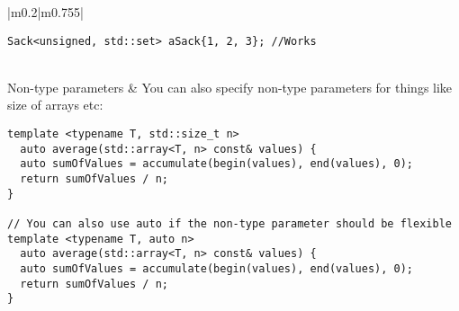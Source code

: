 \documentclass[main.tex,fontsize=8pt,paper=a4,paper=portrait,DIV=calc,]{scrartcl}
\begin{document}
\begin{table}[ht!]
\begin{tabular}{|m{0.2\linewidth}|m{0.755\linewidth}|}
\begin{lstlisting}
Sack<unsigned, std::set> aSack{1, 2, 3}; //Works
\end{lstlisting}\\
\hline
Non-type parameters & 
You can also specify non-type parameters for things like size of arrays etc:\newline
\begin{lstlisting}
template <typename T, std::size_t n>
  auto average(std::array<T, n> const& values) {
  auto sumOfValues = accumulate(begin(values), end(values), 0);
  return sumOfValues / n;
}

// You can also use auto if the non-type parameter should be flexible
template <typename T, auto n>
  auto average(std::array<T, n> const& values) {
  auto sumOfValues = accumulate(begin(values), end(values), 0);
  return sumOfValues / n;
}
\end{lstlisting}\\
\hline
\end{tabular}
\end{table}
\pagebreak
\begin{table}[ht!]
\begin{tabular}{|m{0.2\linewidth}|m{0.755\linewidth}|}
\hline
\end{tabular}
\end{table}
\pagebreak
\end{document}
